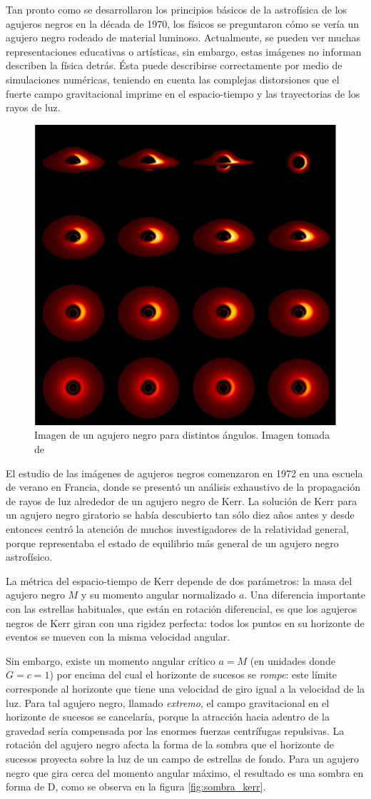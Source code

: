 \documentclass[11pt]{article}
\begin{document}
Tan pronto como se desarrollaron los principios básicos de la astrofísica de los agujeros negros en la década de 1970, los físicos se preguntaron cómo se vería un agujero negro rodeado de material luminoso. Actualmente, se pueden ver muchas representaciones educativas o artísticas, sin embargo, estas imágenes no informan describen la física detrás. Ésta puede describirse correctamente por medio de simulaciones numéricas, teniendo en cuenta las complejas distorsiones que el fuerte campo gravitacional imprime en el espacio-tiempo y las trayectorias de los rayos de luz.  \medskip


\begin{figure}[H]
\centering
\includegraphics[width=0.3\linewidth]{Images/marck_1989.jpg}
\caption{Imagen de un agujero negro para distintos ángulos. Imagen tomada de \cite{Luminet_blog}}
\label{fig:marck1989}
\end{figure}

El estudio de las imágenes de agujeros negros comenzaron en 1972 en una escuela de verano en Francia, donde se presentó un análisis exhaustivo de la propagación de rayos de luz alrededor de un agujero negro de Kerr. La solución de Kerr para un agujero negro giratorio se había descubierto tan sólo diez años antes y desde entonces centró la atención de muchos investigadores de la relatividad general, porque representaba el estado de equilibrio más general de un agujero negro astrofísico. \medskip

La métrica del espacio-tiempo de Kerr depende de dos parámetros: la masa del agujero negro $M$ y su momento angular normalizado $a$. Una diferencia importante con las estrellas habituales, que están en rotación diferencial, es que los agujeros negros de Kerr giran con una rigidez perfecta: todos los puntos en su horizonte de eventos se mueven con la misma velocidad angular. \medskip

Sin embargo, existe un momento angular crítico $a = M$ (en unidades donde $G = c = 1$) por encima del cual el horizonte de sucesos se \emph{rompe}: este límite corresponde al horizonte que tiene una velocidad de giro igual a la velocidad de la luz. Para tal agujero negro, llamado \emph{extremo}, el campo gravitacional en el horizonte de sucesos se cancelaría, porque la atracción hacia adentro de la gravedad sería compensada por las enormes fuerzas centrífugas repulsivas. La rotación del agujero negro afecta la forma de la sombra que el horizonte de sucesos proyecta sobre la luz de un campo de estrellas de fondo. Para un agujero negro que gira cerca del momento angular máximo, el resultado es una sombra en forma de D, como se observa en la figura \ref{fig:sombra_kerr}.
\end{document}
